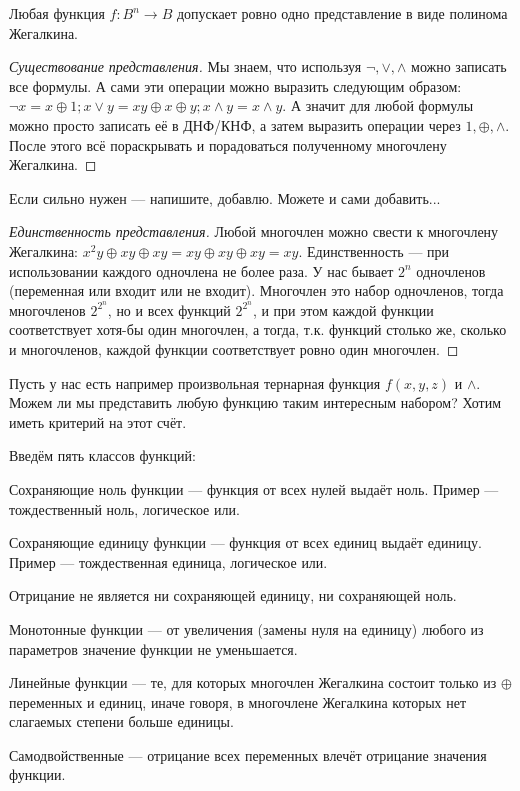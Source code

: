 \begin{theorem}
	Любая функция $f : B^n \to B$ допускает ровно одно представление в виде полинома Жегалкина. 
\end{theorem}

\begin{proof}[Существование представления]
	Мы знаем, что используя $\lnot, \lor, \land$ можно записать все формулы. А сами эти операции можно выразить следующим образом: $\lnot x = x \oplus 1; x \lor y = xy \oplus x \oplus y; x \land y = x \land y$. А значит для любой формулы можно просто записать её в ДНФ/КНФ, а затем выразить операции через $1, \oplus, \land$. После этого всё пораскрывать и порадоваться полученному многочлену Жегалкина.
\end{proof}
\begin{example}
	Если сильно нужен --- напишите, добавлю. Можете и сами добавить...
\end{example}
\begin{proof}[Единственность представления]

	Любой многочлен можно свести к многочлену Жегалкина: $x^2y \oplus xy \oplus xy = xy \oplus xy \oplus xy = xy$. Единственность --- при использовании каждого одночлена не более раза. 
	У нас бывает $2^n$ одночленов (переменная или входит или не входит). Многочлен это набор одночленов, тогда многочленов $2^{2^n}$, но и всех функций $2^{2^n}$, и при этом каждой функции соответствует хотя-бы один многочлен, а тогда, т.к. функций столько же, сколько и многочленов, каждой функции соответствует ровно один многочлен.
\end{proof}

Пусть у нас есть например произвольная тернарная функция $f(x, y, z)$ и $\land$. Можем ли мы представить любую функцию таким интересным набором? Хотим иметь критерий на этот счёт. 

\begin{definition}
	Введём пять классов функций:

	Сохраняющие ноль функции --- функция от всех нулей выдаёт ноль. Пример --- тождественный ноль, логическое или.

	Сохраняющие единицу функции --- функция от всех единиц выдаёт единицу. Пример --- тождественная единица, логическое или.

	Отрицание не является ни сохраняющей единицу, ни сохраняющей ноль.

	Монотонные функции --- от увеличения (замены нуля на единицу) любого из параметров значение функции не уменьшается. 

	Линейные функции --- те, для которых многочлен Жегалкина состоит только из $\oplus$ переменных и единиц, иначе говоря, в многочлене Жегалкина которых нет слагаемых степени больше единицы.

	Самодвойственные --- отрицание всех переменных влечёт отрицание значения функции. 
\end{definition}

